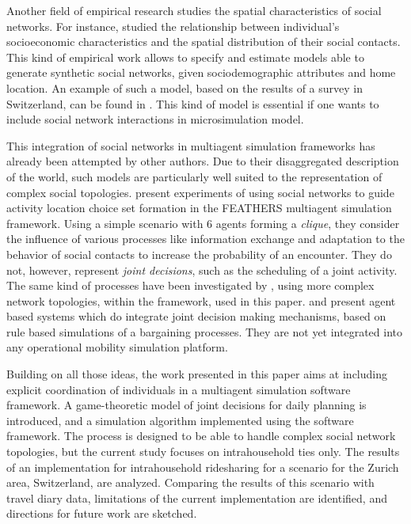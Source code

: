 {Another field of empirical research studies the spatial characteristics of social networks.
For instance,  studied the relationship between individual's socioeconomic
characteristics and the spatial distribution of their social contacts.
This kind of empirical work allows to specify and estimate models able to generate synthetic social networks,
given sociodemographic attributes and home location.
An example of such a model, based on the results of a survey in Switzerland,
can be found in .
This kind of model is essential if one wants to include social network interactions
in microsimulation model.

This integration of social networks in multiagent simulation frameworks has already
been attempted by other authors.
Due to their disaggregated description of the world,
such models are particularly well suited to the representation of complex social topologies.
 present experiments of using social networks
to guide activity location choice set formation in the FEATHERS multiagent simulation framework.
Using a simple scenario with 6 agents forming a \emph{clique},
they consider the influence of various processes like
information exchange and adaptation to the behavior of social contacts to increase the probability
of an encounter.
They do not, however, represent \emph{joint decisions}, such as the scheduling of a joint activity.
The same kind of processes have been investigated by ,
using more complex network topologies,
within the \matsim framework, used in this paper.
and 
present agent based systems which do integrate
joint decision making mechanisms,
based on rule based simulations of a bargaining processes.
They are not yet integrated into
any operational mobility simulation platform.

Building on all those ideas,
the work presented in this paper aims at including explicit coordination of individuals
in a multiagent simulation software framework.
A game-theoretic model of joint decisions for daily planning is introduced,
and a simulation algorithm implemented using the
\matsim software framework.
The process is designed to be able to handle complex social network topologies,
but the current study focuses on intrahousehold ties only.
The results of an implementation for intrahousehold ridesharing
for a scenario for the Zurich area, Switzerland, are analyzed.
Comparing the results of this scenario with travel diary data,
limitations of the current implementation are identified,
and directions for future work are sketched.

}
